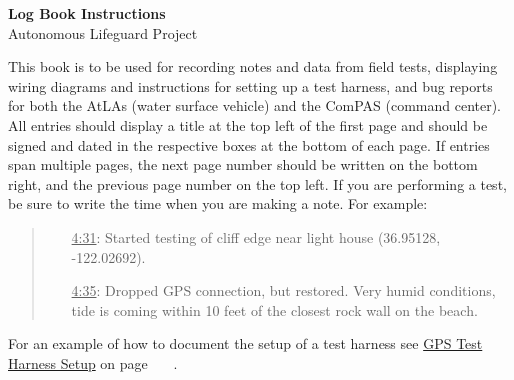 \documentclass[11pt]{article}
\begin{document}
\begin{center} 
{
    {\Large \textbf{Log Book Instructions}}\\
  	{\large Autonomous Lifeguard Project}
}
\end{center}

This book is to be used for recording notes and data from field tests, displaying wiring diagrams and instructions for setting up a test harness, and bug reports for both the AtLAs (water surface vehicle) and the ComPAS (command center).\\

\noindent All entries should display a title at the top left of the first page and should be signed and dated in the respective boxes at the bottom of each page. If entries span multiple pages, the next page number should be written on the bottom right, and the previous page number on the top left. If you are performing a test, be sure to write the time when you are making a note. For example:

\begin{quote}
\begin{itemize}
\item[\uline{4:31}:]{Started testing of cliff edge near light house (36.95128, -122.02692).}
\item[\uline{4:35}:]{Dropped GPS connection, but restored. Very humid conditions, tide is coming within 10 feet of the closest rock wall on the beach.}
\end{itemize}
\end{quote}

\noindent For an example of how to document the setup of a test harness see \uline{GPS Test Harness Setup} on page \ \ \ .
\end{document}
